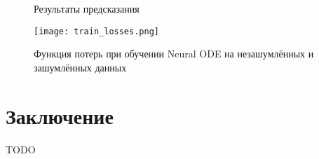 \documentclass[a4paper, 14pt]{article}
\begin{document}
	\begin{figure}[bhtp]
		\centering
		\caption{Результаты предсказания}
		\label{fig:spirals_approximation}
	\end{figure}
	
	\begin{figure}[bhtp]
		\texttt{[image: train\_losses.png]}
		\caption{Функция потерь при обучении Neural ODE на незашумлённых и зашумлённых данных}
		\label{fig:train_losses}
	\end{figure}
	
	\section{Заключение}
	TODO
	
	
	
	
\end{document}
